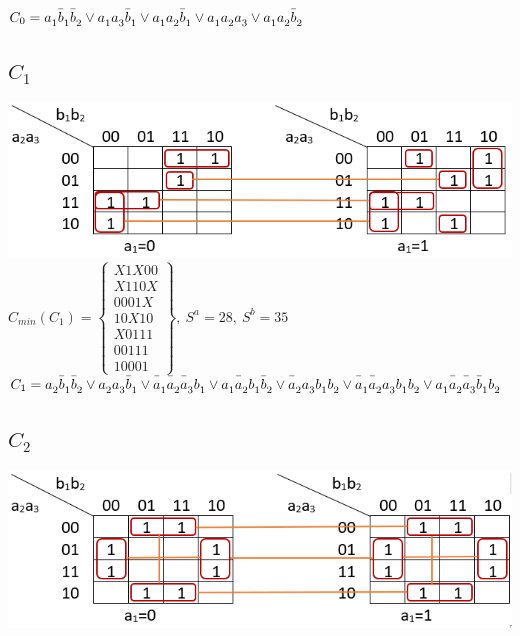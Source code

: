 \documentclass[a4paper, 12pt]{article}
\begin{document}
$C_0={\mathstrut a}_1\bar{\mathstrut b}_1\bar{\mathstrut b}_2\vee
{\mathstrut a}_1{\mathstrut a}_3\bar{\mathstrut b}_1\vee
{\mathstrut a}_1{\mathstrut a}_2\bar{\mathstrut b}_1\vee
{\mathstrut a}_1{\mathstrut a}_2{\mathstrut a}_3\vee
{\mathstrut a}_1{\mathstrut a}_2\bar{\mathstrut b}_2$
\subsection*{$C_1$}
\includegraphics[width=14cm]{c1.png}\\

$C_{min}(C_1)=\left\lbrace
\begin{array}{c}
	X1X00\\
	X110X\\
	0001X\\
	10X10\\
	X0111\\
	00111\\
	10001
\end{array}\right\rbrace,\
S^a=28,\ S^b=35$\\

$C_1={\mathstrut a}_2\bar{\mathstrut b}_1\bar{\mathstrut b}_2\vee
{\mathstrut a}_2{\mathstrut a}_3\bar{\mathstrut b}_1\vee
\bar{\mathstrut a}_1\bar{\mathstrut a}_2\bar{\mathstrut a}_3{\mathstrut b}_1\vee
{\mathstrut a}_1\bar{\mathstrut a}_2{\mathstrut b}_1\bar{\mathstrut b}_2\vee
\bar{\mathstrut a}_2{\mathstrut a}_3{\mathstrut b}_1{\mathstrut b}_2\vee
\bar{\mathstrut a}_1\bar{\mathstrut a}_2{\mathstrut a}_3{\mathstrut b}_1{\mathstrut b}_2\vee
{\mathstrut a}_1\bar{\mathstrut a}_2\bar{\mathstrut a}_3\bar{\mathstrut b}_1{\mathstrut b}_2$
\subsection*{$C_2$}
\includegraphics[width=14cm]{c2.png}\\
\end{document}
